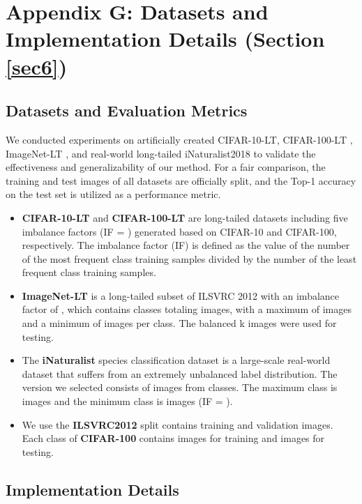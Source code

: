 \documentclass[10pt,twocolumn,letterpaper]{article}
\begin{document}
\section*{Appendix G: Datasets and Implementation Details (Section \ref{sec6})}
\label{secG}

\subsection*{Datasets and Evaluation Metrics}
\label{secG.1}

We conducted experiments on artificially created CIFAR-10-LT, CIFAR-100-LT \cite{paper4}, ImageNet-LT \cite{paper4,paper26}, and real-world long-tailed iNaturalist2018 \cite{paper24} to validate the effectiveness and generalizability of our method. For a fair comparison, the training and test images of all datasets are officially split, and the Top-1 accuracy on the test set is utilized as a performance metric.

\begin{itemize}
  \item \textbf{CIFAR-10-LT} and \textbf{CIFAR-100-LT} are long-tailed datasets including five imbalance factors (IF = ) generated based on CIFAR-10 and CIFAR-100, respectively. The imbalance factor (IF) is defined as the value of the number of the most frequent class training samples divided by the number of the least frequent class training samples.

  \item \textbf{ImageNet-LT} is a long-tailed subset of ILSVRC 2012 with an imbalance factor of , which contains  classes totaling  images, with a maximum of  images and a minimum of  images per class. The balanced k images were used for testing.

  \item The \textbf{iNaturalist} species classification dataset is a large-scale real-world dataset that suffers from an extremely unbalanced label distribution. The  version we selected consists of  images from  classes. The maximum class is  images and the minimum class is  images (IF = ).
  \item We use the \textbf{ILSVRC2012} split contains  training and  validation images. Each class of \textbf{CIFAR-100} contains  images for training and  images for testing.
\end{itemize}

\subsection*{Implementation Details}
\label{secG.2}
\end{document}
